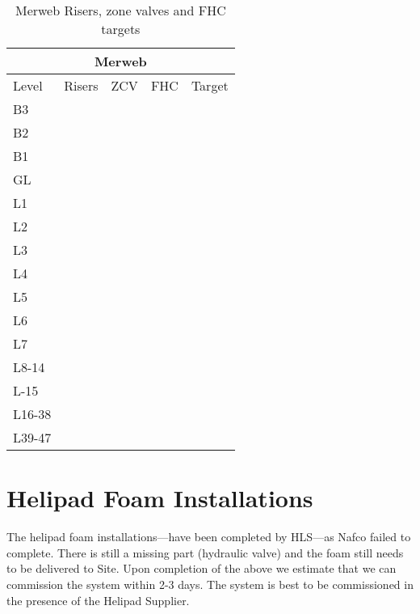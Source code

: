 \begin{table}[htbp]\label{tbl:fire3}
\begin{center}
\begin{tabular}{lllll}
\toprule
\multicolumn{5}{c}{Merweb}\\
\midrule
Level	&Risers &ZCV	&FHC  &Target\\
\midrule
B3	&\checkmark     &\checkmark	 &\checkmark  &\\
B2	&\checkmark     &\checkmark	 &\checkmark  &\\
B1	&\checkmark     &\checkmark	 &\checkmark  &\\
GL	&\checkmark     &\checkmark	 &\checkmark  &\\
L1	&\checkmark     &\checkmark	 &\checkmark  &\\
L2	&\checkmark     &\checkmark	 &\checkmark  &\\
L3	&\checkmark     &\checkmark	 &\checkmark  &\\
L4	&\checkmark     &\checkmark	 &\checkmark  &\\
L5	&\checkmark     &\checkmark	 &\checkmark  &\\
L6	&\checkmark     &\checkmark	 &\checkmark  &\\
L7	&\checkmark     &\checkmark	 &\checkmark  &\\
\midrule
L8-14	&\checkmark     &\checkmark	 &\checkmark  &\\
L-15	&\checkmark     &\checkmark	 &\checkmark  &\\
L16-38	&\checkmark     &\checkmark	 &\checkmark  &\\
L39-47	&\checkmark     &\checkmark	 &\checkmark  &\\
\bottomrule
\end{tabular}
\caption{Merweb Risers, zone valves and FHC targets}
\end{center}
\end{table}

\section{Helipad Foam Installations}

The helipad foam installations---have been completed by HLS---as Nafco failed to complete. There is still a missing part (hydraulic valve) and the foam still needs to be delivered to Site. Upon completion of the above we estimate that we can commission the system within 2-3 days. The system is best to be commissioned in the presence of the Helipad Supplier.



